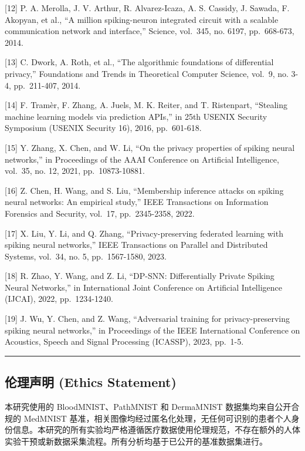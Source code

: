 \documentclass[
]{article}
\begin{document}
{[}12{]} P. A. Merolla, J. V. Arthur, R. Alvarez-Icaza, A. S. Cassidy,
J. Sawada, F. Akopyan, et al., ``A million spiking-neuron integrated
circuit with a scalable communication network and interface,'' Science,
vol.~345, no. 6197, pp.~668-673, 2014.

{[}13{]} C. Dwork, A. Roth, et al., ``The algorithmic foundations of
differential privacy,'' Foundations and Trends in Theoretical Computer
Science, vol.~9, no. 3-4, pp.~211-407, 2014.

{[}14{]} F. Tramèr, F. Zhang, A. Juels, M. K. Reiter, and T. Ristenpart,
``Stealing machine learning models via prediction APIs,'' in 25th USENIX
Security Symposium (USENIX Security 16), 2016, pp.~601-618.

{[}15{]} Y. Zhang, X. Chen, and W. Li, ``On the privacy properties of
spiking neural networks,'' in Proceedings of the AAAI Conference on
Artificial Intelligence, vol.~35, no. 12, 2021, pp.~10873-10881.

{[}16{]} Z. Chen, H. Wang, and S. Liu, ``Membership inference attacks on
spiking neural networks: An empirical study,'' IEEE Transactions on
Information Forensics and Security, vol.~17, pp.~2345-2358, 2022.

{[}17{]} X. Liu, Y. Li, and Q. Zhang, ``Privacy-preserving federated
learning with spiking neural networks,'' IEEE Transactions on Parallel
and Distributed Systems, vol.~34, no. 5, pp.~1567-1580, 2023.

{[}18{]} R. Zhao, Y. Wang, and Z. Li, ``DP-SNN: Differentially Private
Spiking Neural Networks,'' in International Joint Conference on
Artificial Intelligence (IJCAI), 2022, pp.~1234-1240.

{[}19{]} J. Wu, Y. Chen, and Z. Wang, ``Adversarial training for
privacy-preserving spiking neural networks,'' in Proceedings of the IEEE
International Conference on Acoustics, Speech and Signal Processing
(ICASSP), 2023, pp.~1-5.

\begin{center}\rule{0.5\linewidth}{0.5pt}\end{center}

\subsection{伦理声明 (Ethics
Statement)}\label{ux4f26ux7406ux58f0ux660e-ethics-statement}

本研究使用的 BloodMNIST、PathMNIST 和 DermaMNIST 数据集均来自公开合规的
MedMNIST
基准，相关图像均经过匿名化处理，无任何可识别的患者个人身份信息。本研究的所有实验均严格遵循医疗数据使用伦理规范，不存在额外的人体实验干预或新数据采集流程。所有分析均基于已公开的基准数据集进行。
\end{document}
